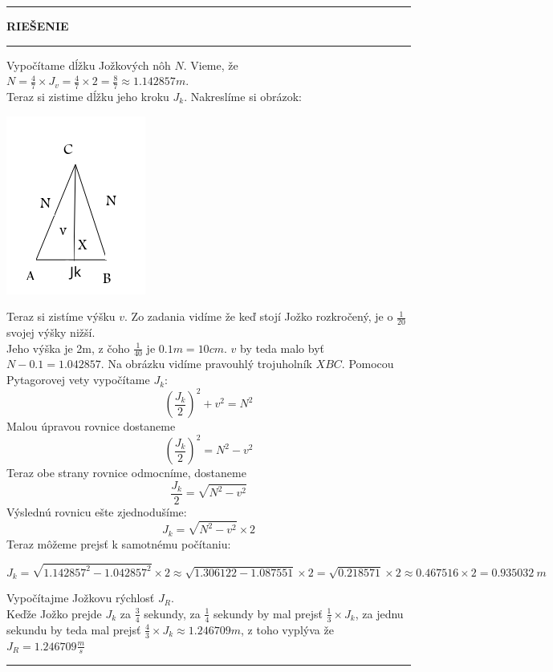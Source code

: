 \documentclass{article}
\begin{document}
\hrule
\medskip
\begin{center}
\textbf{\huge RIEŠENIE}
\end{center}
\medskip
\hrule
\medskip
Vypočítame dĺžku Jožkových nôh $N$.
Vieme, že $N = \frac{4}{7} \times J_v = \frac{4}{7} \times 2 = \frac{8}{7} \approx 1.142857 m  $.\\
Teraz si zistime dĺžku jeho kroku $J_k$.
Nakreslíme si obrázok:
\medskip
\begin{center}
	\includegraphics{imagex/trojuholnik.png}
\end{center}

\noindent Teraz si zistíme výšku $v$. Zo zadania vidíme že keď stojí Jožko rozkročený, je o $\frac{1}{20}$ svojej výšky nižší.\\
Jeho výška je 2m, z čoho $\frac{1}{40}$ je $0.1m = 10cm$.
$v$ by teda malo byť $N - 0.1 = 1.042857$.
Na obrázku vidíme pravouhlý trojuholník $XBC$.
Pomocou Pytagorovej vety vypočítame $J_k$:
\[
	(\frac{J_k}{2})^2+v^2 = N^2
\]
Malou úpravou rovnice dostaneme
\[
	(\frac{J_k}{2})^2 = N^2 - v^2
\]
Teraz obe strany rovnice odmocníme, dostaneme
\[
	\frac{J_k}{2} = \sqrt{N^2 - v^2}
\]
Výslednú rovnicu ešte zjednodušíme:
\[
	J_k = \sqrt{N^2 - v^2} \times 2
\]
Teraz môžeme prejsť k samotnému počítaniu:
\begin{center}
\[
	J_k = \sqrt{1.142857^2 - 1.042857^2} \times 2 \approx \sqrt{1.306122 - 1.087551} \times 2 = \sqrt{0.218571} \times 2 \approx 0.467516 \times 2 = 0.935032\ m
\]
\end{center}
\medskip
Vypočítajme Jožkovu rýchlosť $J_R$.\\
Keďže Jožko prejde $J_k$ za $\frac{3}{4}$ sekundy, za $\frac{1}{4}$ sekundy by mal prejsť $\frac{1}{3} \times J_k$, za jednu sekundu by teda mal prejsť $\frac{4}{3} \times J_k \approx 1.246709 m$, z toho vyplýva že $J_R = 1.246709 \frac{m}{s}$
\medskip
\hrule
\end{document}
